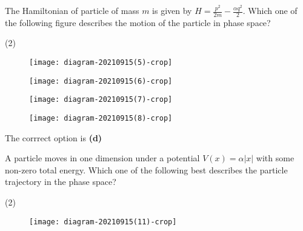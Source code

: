 \begin{enumerate}
\begin{minipage}{\textwidth}
	\item The Hamiltonian of particle of mass $m$ is given by $H=\frac{p^{2}}{2 m}-\frac{\alpha q^{2}}{2}$. Which one of the following figure describes the motion of the particle in phase space?
\end{minipage}
\begin{tasks}(2)
	\task[\textbf{A.}]\begin{figure}[H]
		\centering
		\texttt{[image: diagram-20210915(5)-crop]}
	\end{figure}
	\task[\textbf{B.}]\begin{figure}[H]
		\centering
		\texttt{[image: diagram-20210915(6)-crop]}
	\end{figure}
	\task[\textbf{C.}]\begin{figure}[H]
		\centering
		\texttt{[image: diagram-20210915(7)-crop]}
	\end{figure}
	\task[\textbf{D.}]\begin{figure}[H]
		\centering
		\texttt{[image: diagram-20210915(8)-crop]}
	\end{figure}
\end{tasks}
\begin{answer}
	The corrrect option is \textbf{(d)}
\end{answer}
\begin{minipage}{\textwidth}
	\item A particle moves in one dimension under a potential $V(x)=\alpha|x|$ with some non-zero total energy. Which one of the following best describes the particle trajectory in the phase space?
\end{minipage}
\begin{tasks}(2)
	\task[\textbf{A.}]\begin{figure}[H]
		\centering
		\texttt{[image: diagram-20210915(11)-crop]}
	

\end{figure}
\end{tasks}
\end{enumerate}
